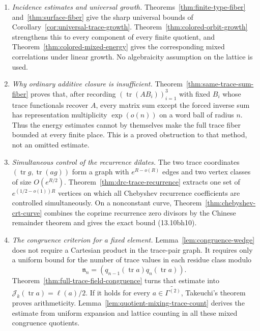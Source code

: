 \documentclass[11pt,reqno]{amsart}
\theoremstyle{definition}
\theoremstyle{remark}
\newcommand{\Tr}{\operatorname{tr}}
\begin{document}
\begin{enumerate}[label=\textbf{\arabic*.},leftmargin=*]
\item \emph{Incidence estimates and universal growth.}
Theorems~\ref{thm:finite-type-fiber} and~\ref{thm:surface-fiber} give the
sharp universal bounds of Corollary~\ref{cor:universal-trace-growth}.
Theorem~\ref{thm:colored-orbit-growth} strengthens this to every component of
every finite quotient, and Theorem~\ref{thm:colored-mixed-energy} gives the
corresponding mixed correlations under linear growth.  No algebraicity
assumption on the lattice is used.

\item \emph{Why ordinary additive closure is insufficient.}
Theorem~\ref{thm:same-trace-sum-fiber} proves that, after recording
\((\Tr(AB_i))_{i=1}^3\) with fixed \(B_i\) whose trace functionals recover
\(A\), every matrix sum except the forced inverse sum has representation
multiplicity \(\exp(o(n))\) on a word ball of radius \(n\).  Thus the energy
estimates cannot by themselves make the full trace fiber bounded at every finite place.  This is
a proved obstruction to that method, not an omitted estimate.

\item \emph{Simultaneous control of the recurrence dilates.}
The two trace coordinates \((\Tr g,\Tr(ag))\) form a graph with
\(e^{R-o(R)}\) edges and two vertex classes of size \(O(e^{R/2})\).
Theorem~\ref{thm:drc-trace-recurrence} extracts one set of
\(e^{(1/2-o(1))R}\) vertices on which all Chebyshev recurrence
coefficients are controlled simultaneously.  On a nonconstant curve,
Theorem~\ref{thm:chebyshev-crt-curve} combines the coprime recurrence zero
divisors by the Chinese remainder theorem and gives the exact bound
(13.10bh10).

\item \emph{The congruence criterion for a fixed element.}
Lemma~\ref{lem:congruence-wedge} does not require a Cartesian product in the
trace-pair graph.  It requires only a uniform bound for the number of trace
values in each residue class modulo
\[
 \mathfrak n_n=(q_{n-1}(\Tr a)q_n(\Tr a)).
\]
Theorem~\ref{thm:full-trace-field-congruence} turns that estimate into
\(\mathcal J_k(\Tr a)=\ell(a)/2\).  If it holds for every
\(a\in\widetilde{\Gamma^{(2)}}\), Takeuchi's theorem \cite{Takeuchi} proves arithmeticity.
Lemma~\ref{lem:quotient-mixing-trace-count} derives the estimate from
uniform expansion and lattice counting in all these mixed congruence
quotients.


\end{enumerate}
\end{document}
